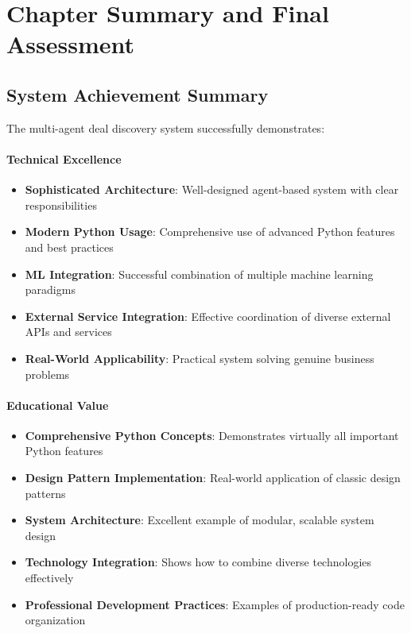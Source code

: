 \section{Chapter Summary and Final Assessment}

\subsection{System Achievement Summary}

The multi-agent deal discovery system successfully demonstrates:

\paragraph{Technical Excellence \starfull\starfull\starfull\starfull\starfull}
\begin{itemize}
\item \textbf{Sophisticated Architecture}: Well-designed agent-based system with clear responsibilities
\item \textbf{Modern Python Usage}: Comprehensive use of advanced Python features and best practices
\item \textbf{ML Integration}: Successful combination of multiple machine learning paradigms
\item \textbf{External Service Integration}: Effective coordination of diverse external APIs and services
\item \textbf{Real-World Applicability}: Practical system solving genuine business problems
\end{itemize}

\paragraph{Educational Value \starfull\starfull\starfull\starfull\starfull}
\begin{itemize}
\item \textbf{Comprehensive Python Concepts}: Demonstrates virtually all important Python features
\item \textbf{Design Pattern Implementation}: Real-world application of classic design patterns
\item \textbf{System Architecture}: Excellent example of modular, scalable system design
\item \textbf{Technology Integration}: Shows how to combine diverse technologies effectively
\item \textbf{Professional Development Practices}: Examples of production-ready code organization
\end{itemize}

